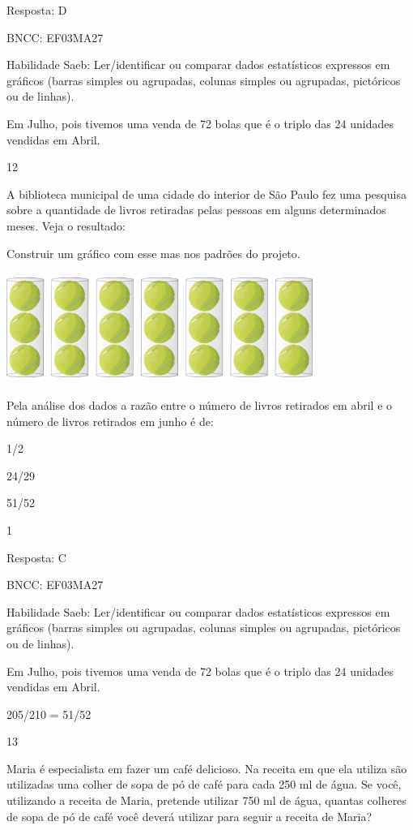 \begin{escolha}
{\begin{escolha}
{Resposta: D

BNCC: EF03MA27

Habilidade Saeb: Ler/identificar ou comparar dados estatísticos
expressos em gráficos (barras simples ou agrupadas, colunas simples ou
agrupadas, pictóricos ou de linhas).

Em Julho, pois tivemos uma venda de 72 bolas que é o triplo das 24
unidades vendidas em Abril.

\num{12}

A biblioteca municipal de uma cidade do interior de São Paulo fez uma
pesquisa sobre a quantidade de livros retiradas pelas pessoas em alguns
determinados meses. Veja o resultado:

Construir um gráfico com esse mas nos padrões do projeto.

\includegraphics[width=3.93590in,height=1.40906in]{media/image121.png}

Pela análise dos dados a razão entre o número de livros retirados em
abril e o número de livros retirados em junho é de:

\begin{escolha}
\item
  1/2
\item
  24/29
\item
  51/52
\item
  1
\end{escolha}

Resposta: C

BNCC: EF03MA27

Habilidade Saeb: Ler/identificar ou comparar dados estatísticos
expressos em gráficos (barras simples ou agrupadas, colunas simples ou
agrupadas, pictóricos ou de linhas).

Em Julho, pois tivemos uma venda de 72 bolas que é o triplo das 24
unidades vendidas em Abril.

205/210 = 51/52

\num{13}

Maria é especialista em fazer um café delicioso. Na receita em que ela
utiliza são utilizadas uma colher de sopa de pó de café para cada 250 ml
de água. Se você, utilizando a receita de Maria, pretende utilizar 750
ml de água, quantas colheres de sopa de pó de café você deverá utilizar
para seguir a receita de Maria?

}
\end{escolha}}
\end{escolha}
